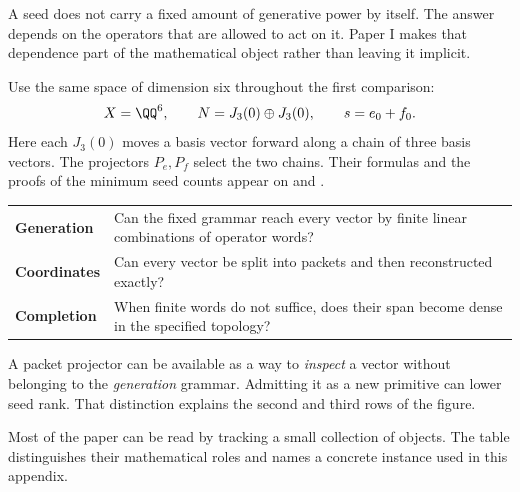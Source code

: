 
A seed does not carry a fixed amount of generative power by itself. The answer depends on the operators that are allowed to act on it. Paper I makes that dependence part of the mathematical object rather than leaving it implicit.

Use the same space of dimension six throughout the first comparison:
\[
X=\QQ^6,\qquad N=J_3(0)\oplus J_3(0),\qquad
s=e_0+f_0.
\]
Here each $J_3(0)$ moves a basis vector forward along a chain of three basis vectors. The projectors $P_e,P_f$ select the two chains. Their formulas and the proofs of the minimum seed counts appear on  and .


\begin{tabularx}{\linewidth}{@{}p{.18\linewidth}Y@{}}
\textbf{Generation} & Can the fixed grammar reach every vector by finite linear combinations of operator words?\\[4pt]
\textbf{Coordinates} & Can every vector be split into packets and then reconstructed exactly?\\[4pt]
\textbf{Completion} & When finite words do not suffice, does their span become dense in the specified topology?
\end{tabularx}

A packet projector can be available as a way to \emph{inspect} a vector without belonging to the \emph{generation} grammar. Admitting it as a new primitive can lower seed rank. That distinction explains the second and third rows of the figure.


Most of the paper can be read by tracking a small collection of objects. The table distinguishes their mathematical roles and names a concrete instance used in this appendix.

